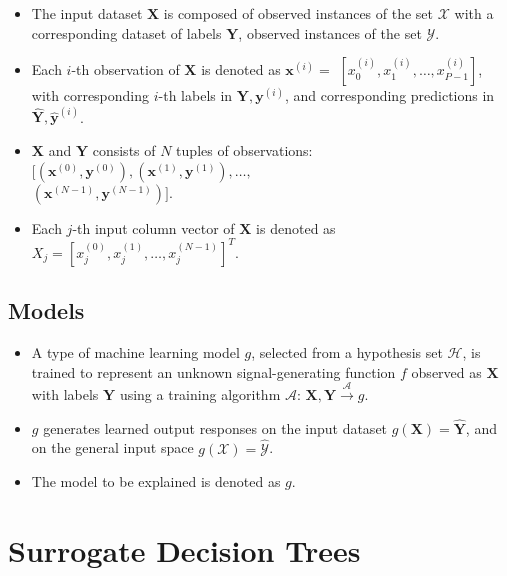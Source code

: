 \documentclass[11pt]{asaproc}
\begin{document}
	\begin{itemize}
		\item The input dataset $\mathbf{X}$ is composed of observed instances of the set $\mathcal{X}$ with a corresponding dataset of labels $\mathbf{Y}$, observed instances of the set $\mathcal{Y}$.
		\item Each $i$-th observation of $\mathbf{X}$ is denoted as $\mathbf{x}^{(i)} = $  
		$[x_0^{(i)}, x_1^{(i)}, \dots, x_{\textit{P}-1}^{(i)}]$, with corresponding $i$-th labels in $\mathbf{Y}, \mathbf{y}^{(i)}$, and corresponding predictions in $\mathbf{\hat{Y}}, \mathbf{\hat{y}}^{(i)}$. %
		\item $\mathbf{X}$ and $\mathbf{Y}$ consists of $N$ tuples of observations: $[(\mathbf{x}^{(0)},\mathbf{y}^{(0)}), (\mathbf{x}^{(1)},\mathbf{y}^{(1)}), \dots,$\\$(\mathbf{x}^{(N-1)},\mathbf{y}^{(N-1)})]$. %
		\item Each $j$-th input column vector of $\mathbf{X}$ is denoted as $X_j = [x_{j}^{(0)}, x_{j}^{(1)}, \dots, x_{j}^{(N-1)}]^T$.
	\end{itemize}	 

\subsection{Models}

	\begin{itemize}
		\item A type of machine learning model $g$, selected from a hypothesis set $\mathcal{H}$, is trained to represent an unknown signal-generating function $f$ observed as  $\mathbf{X}$ with labels $\mathbf{Y}$ using a training algorithm $\mathcal{A}$: 
		$ \mathbf{X}, \mathbf{Y} \xrightarrow{\mathcal{A}} g$.
		\item $g$ generates learned output responses on the input dataset $g(\mathbf{X}) = \mathbf{\hat{Y}}$, and on the general input space $g(\mathcal{X}) = \mathcal{\hat{Y}}$.
		\item The model to be explained is denoted as $g$.
	\end{itemize}

\section{Surrogate Decision Trees} \label{sec:surrogate_dt}
\end{document}
